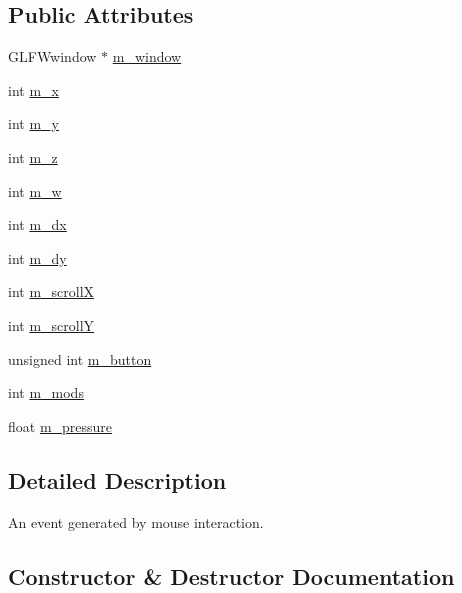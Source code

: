 \subsection*{Public Attributes}
\begin{DoxyCompactItemize}
\item 
G\+L\+F\+Wwindow $\ast$ \mbox{\hyperlink{structec_1_1_mouse_event_aaaf460aa884923e375b961e64a8d55aa}{m\+\_\+window}}
\item 
int \mbox{\hyperlink{structec_1_1_mouse_event_a671dcffa3a0310413d260bc6c5f3c7ec}{m\+\_\+x}}
\item 
int \mbox{\hyperlink{structec_1_1_mouse_event_a70f1a81a4a1099cb425a4461d23dfbba}{m\+\_\+y}}
\item 
int \mbox{\hyperlink{structec_1_1_mouse_event_a6ba4ec5d26b3dbe8be4d57b4197bada2}{m\+\_\+z}}
\item 
int \mbox{\hyperlink{structec_1_1_mouse_event_af7836a93b994d8807394fa24b25f31b8}{m\+\_\+w}}
\item 
int \mbox{\hyperlink{structec_1_1_mouse_event_aab5ddd319c18746f3d09ed09b5d2281e}{m\+\_\+dx}}
\item 
int \mbox{\hyperlink{structec_1_1_mouse_event_ad22c4d8c193a57c1ca849851ba5b4ebf}{m\+\_\+dy}}
\item 
int \mbox{\hyperlink{structec_1_1_mouse_event_a957534c425902b9de4a416459ef17aa5}{m\+\_\+scrollX}}
\item 
int \mbox{\hyperlink{structec_1_1_mouse_event_add0e314af571f90b9f514991ce19896f}{m\+\_\+scrollY}}
\item 
unsigned int \mbox{\hyperlink{structec_1_1_mouse_event_a094f93fb232556fd71f8351ffe03efb4}{m\+\_\+button}}
\item 
int \mbox{\hyperlink{structec_1_1_mouse_event_ae2df7e912c0ddbd14a67f7686ebdeba8}{m\+\_\+mods}}
\item 
float \mbox{\hyperlink{structec_1_1_mouse_event_a2a6711331cfcdbcc5b889c4805db48bf}{m\+\_\+pressure}}
\end{DoxyCompactItemize}


\subsection{Detailed Description}
An event generated by mouse interaction. 

\subsection{Constructor \& Destructor Documentation}
\mbox{\label{structec_1_1_mouse_event_a4a2528518564c73d9b06284c9530b000}} 
